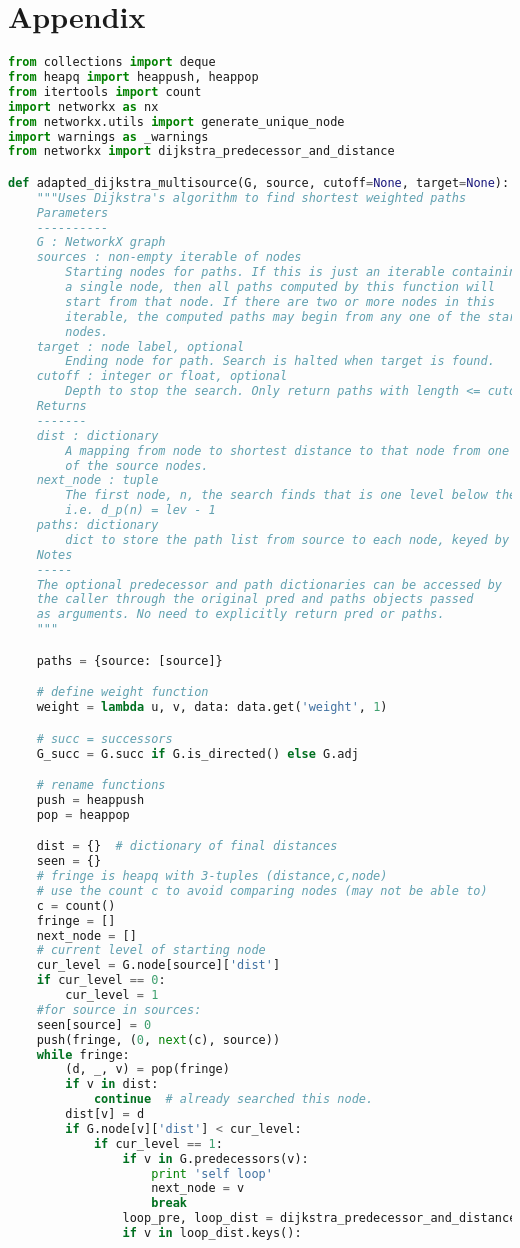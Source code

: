 \section{Appendix}
\begin{lstlisting}[language=Python]
from collections import deque
from heapq import heappush, heappop
from itertools import count
import networkx as nx
from networkx.utils import generate_unique_node
import warnings as _warnings
from networkx import dijkstra_predecessor_and_distance

def adapted_dijkstra_multisource(G, source, cutoff=None, target=None):
    """Uses Dijkstra's algorithm to find shortest weighted paths
    Parameters
    ----------
    G : NetworkX graph
    sources : non-empty iterable of nodes
        Starting nodes for paths. If this is just an iterable containing
        a single node, then all paths computed by this function will
        start from that node. If there are two or more nodes in this
        iterable, the computed paths may begin from any one of the start
        nodes.
    target : node label, optional
        Ending node for path. Search is halted when target is found.
    cutoff : integer or float, optional
        Depth to stop the search. Only return paths with length <= cutoff.
    Returns
    -------
    dist : dictionary
        A mapping from node to shortest distance to that node from one
        of the source nodes.
    next_node : tuple
        The first node, n, the search finds that is one level below the current node
        i.e. d_p(n) = lev - 1
    paths: dictionary
        dict to store the path list from source to each node, keyed by node.
    Notes
    -----
    The optional predecessor and path dictionaries can be accessed by
    the caller through the original pred and paths objects passed
    as arguments. No need to explicitly return pred or paths.
    """

    paths = {source: [source]}

    # define weight function
    weight = lambda u, v, data: data.get('weight', 1)

    # succ = successors
    G_succ = G.succ if G.is_directed() else G.adj

    # rename functions
    push = heappush
    pop = heappop

    dist = {}  # dictionary of final distances
    seen = {}
    # fringe is heapq with 3-tuples (distance,c,node)
    # use the count c to avoid comparing nodes (may not be able to)
    c = count()
    fringe = []
    next_node = []
    # current level of starting node
    cur_level = G.node[source]['dist']
    if cur_level == 0:
        cur_level = 1
    #for source in sources:
    seen[source] = 0
    push(fringe, (0, next(c), source))
    while fringe:
        (d, _, v) = pop(fringe)
        if v in dist:
            continue  # already searched this node.
        dist[v] = d
        if G.node[v]['dist'] < cur_level:
            if cur_level == 1:
                if v in G.predecessors(v):
                    print 'self loop'
                    next_node = v
                    break
                loop_pre, loop_dist = dijkstra_predecessor_and_distance(G, v)
                if v in loop_dist.keys():


\end{lstlisting}
